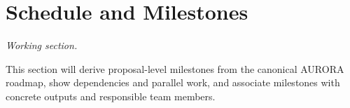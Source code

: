 \section{Schedule and Milestones}
\label{sec:schedule}

\textit{Working section.}

This section will derive proposal-level milestones from the canonical AURORA roadmap,
show dependencies and parallel work, and associate milestones with concrete outputs
and responsible team members.
